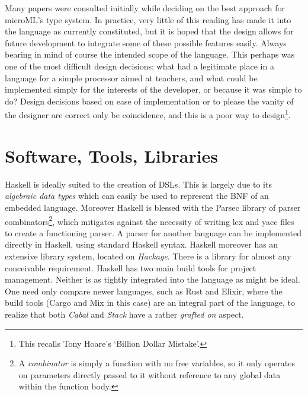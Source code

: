 \documentclass[12pt, a4paper]{report}
\begin{document}
Many papers were consulted initially while deciding on the best approach for microML's type system.
In practice, very little of this reading has made it into the language as currently constituted, but
it is hoped that the design allows for future development to integrate some of these possible
features easily. Always bearing in mind of course the intended scope of the language. This perhaps
was one of the most difficult design decisions: what had a legitimate place in a language for a
simple processor aimed at teachers, and what could be implemented simply for the interests of the
developer, or because it was simple to do? Design decisions based on ease of implementation or to
please the vanity of the designer are correct only be coincidence, and this is a poor way to
design\footnote{This recalls Tony Hoare's `Billion Dollar Mistake'.}.

\section{Software, Tools, Libraries}
Haskell is ideally suited to the creation of DSLs. This is largely due to its \textit{algebraic data
    types} which can easily be used to represent the BNF of an embedded language. Moreover Haskell is
blessed with the Parsec library of parser combinators\footnote{A \textit{combinator} is simply a
    function with no free variables, so it only operates on parameters directly passed to it without
    reference to any global data within the function body.}, which mitigates against the necessity of
writing lex and yacc files to create a functioning parser. A parser for another language can be
implemented directly in Haskell, using standard Haskell syntax. Haskell moreover has an extensive
library system, located on \textit{Hackage}. There is a library for almost any conceivable
requirement. Haskell has two main build tools for project management. Neither is as tightly
integrated into the language as might be ideal. One need only compare newer languages, such as Rust
and Elixir, where the build tools (Cargo and Mix in this case) are an integral part of the language,
to realize that both \textit{Cabal} and \textit{Stack} have a rather \textit{grafted on} aspect.
\end{document}
